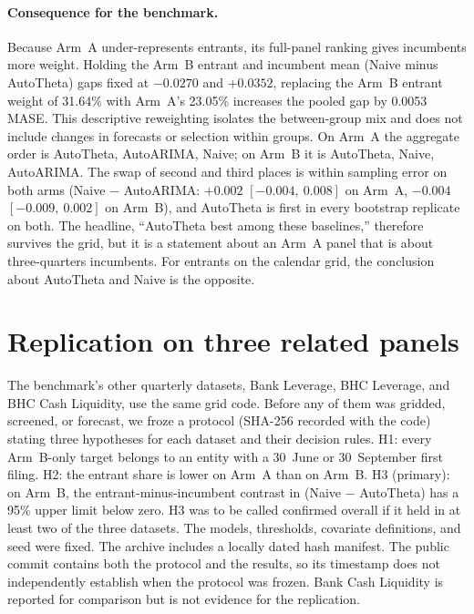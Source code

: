 \documentclass[11pt]{article}
\begin{document}
\paragraph{Consequence for the benchmark.} Because Arm~A under-represents entrants, its full-panel ranking gives incumbents more weight. Holding the Arm~B entrant and incumbent mean (Naive minus AutoTheta) gaps fixed at $-0.0270$ and $+0.0352$, replacing the Arm~B entrant weight of 31.64\% with Arm~A's 23.05\% increases the pooled gap by 0.0053 MASE. This descriptive reweighting isolates the between-group mix and does not include changes in forecasts or selection within groups. On Arm~A the aggregate order is AutoTheta, AutoARIMA, Naive; on Arm~B it is AutoTheta, Naive, AutoARIMA. The swap of second and third places is within sampling error on both arms (Naive $-$ AutoARIMA: $+0.002$ $[-0.004,\ 0.008]$ on Arm~A, $-0.004$ $[-0.009,\ 0.002]$ on Arm~B), and AutoTheta is first in every bootstrap replicate on both. The headline, ``AutoTheta best among these baselines,'' therefore survives the grid, but it is a statement about an Arm~A panel that is about three-quarters incumbents. For entrants on the calendar grid, the conclusion about AutoTheta and Naive is the opposite.

\section{Replication on three related panels}\label{sec:confirm}
The benchmark's other quarterly datasets, Bank Leverage, BHC Leverage, and BHC Cash Liquidity, use the same grid code. Before any of them was gridded, screened, or forecast, we froze a protocol (SHA-256 recorded with the code) stating three hypotheses for each dataset and their decision rules. H1: every Arm~B-only target belongs to an entity with a 30~June or 30~September first filing. H2: the entrant share is lower on Arm~A than on Arm~B. H3 (primary): on Arm~B, the entrant-minus-incumbent contrast in (Naive $-$ AutoTheta) has a 95\% upper limit below zero. H3 was to be called confirmed overall if it held in at least two of the three datasets. The models, thresholds, covariate definitions, and seed were fixed. The archive includes a locally dated hash manifest. The public commit contains both the protocol and the results, so its timestamp does not independently establish when the protocol was frozen. Bank Cash Liquidity is reported for comparison but is not evidence for the replication.
\end{document}

